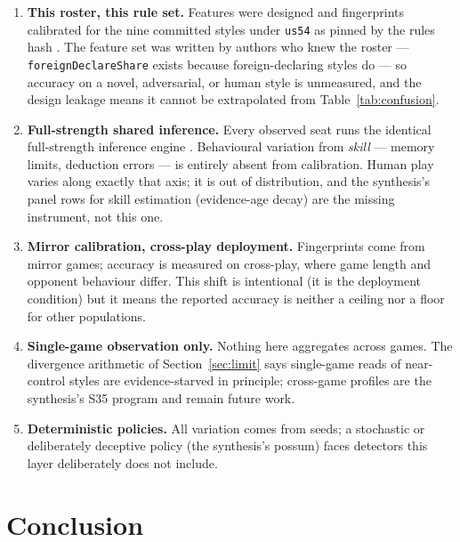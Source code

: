 \documentclass[11pt]{article}
\newcommand{\code}[1]{\texttt{#1}}
\newcommand{\usff}{\code{us54}}
\begin{document}
\begin{enumerate}
\item \textbf{This roster, this rule set.} Features were designed and fingerprints calibrated
  for the nine committed styles under \usff{} as pinned by the rules hash
  \cite{artifact,rules}. The feature set was written by authors who knew the roster ---
  \code{foreignDeclareShare} exists because foreign-declaring styles do --- so accuracy on a
  novel, adversarial, or human style is unmeasured, and the design leakage means it cannot be
  extrapolated from Table~\ref{tab:confusion}.
\item \textbf{Full-strength shared inference.} Every observed seat runs the identical
  full-strength inference engine \cite{v05}. Behavioural variation from \emph{skill} ---
  memory limits, deduction errors --- is entirely absent from calibration. Human play varies
  along exactly that axis; it is out of distribution, and the synthesis's panel rows for
  skill estimation (evidence-age decay) are the missing instrument, not this one.
\item \textbf{Mirror calibration, cross-play deployment.} Fingerprints come from mirror
  games; accuracy is measured on cross-play, where game length and opponent behaviour differ.
  This shift is intentional (it is the deployment condition) but it means the reported
  accuracy is neither a ceiling nor a floor for other populations.
\item \textbf{Single-game observation only.} Nothing here aggregates across games. The
  divergence arithmetic of Section~\ref{sec:limit} says single-game reads of near-control
  styles are evidence-starved in principle; cross-game profiles are the synthesis's S35
  program and remain future work.
\item \textbf{Deterministic policies.} All variation comes from seeds; a stochastic or
  deliberately deceptive policy (the synthesis's possum) faces detectors this layer
  deliberately does not include.
\end{enumerate}

\section{Conclusion}
\label{sec:conclusion}
\end{document}
